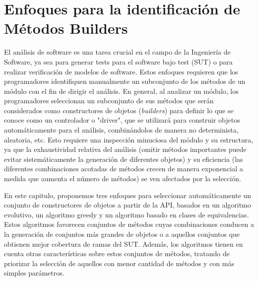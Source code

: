 \chapter[Identificación de métodos builders]{Enfoques para la identificación de Métodos Builders}
\label{cap:builders}

El análisis de software es una tarea crucial en el campo de la Ingeniería de Software, ya sea para generar tests para el software bajo test (SUT)  o para realizar verificación de modelos de software. Estos enfoques requieren que los programadores identifiquen manualmente un subconjunto de los métodos de un módulo con el fin de dirigir el análisis. En general, al analizar un módulo, los programadores seleccionan un subconjunto de sus métodos que serán considerados como constructores de objetos (\emph{builders}) para definir lo que se conoce como un controlador o "driver", que se utilizará para construir objetos automáticamente para el análisis, combinándolos de manera no determinista, aleatoria, etc. Esto requiere una inspección minuciosa del módulo y su estructura, ya que la exhaustividad relativa del análisis (omitir métodos importantes puede evitar sistemáticamente la generación de diferentes objetos) y su eficiencia (las diferentes combinaciones acotadas de métodos crecen de manera exponencial a medida que aumenta el número de métodos) se ven afectados por la selección.

En este capitulo, proponemos tres enfoques para seleccionar automáticamente un conjunto de constructores de objetos a partir de la API, basados en un algoritmo evolutivo, un algoritmo greedy y un algoritmo basado en clases de equivalencias. Estos algoritmos favorecen conjuntos de métodos cuyas combinaciones conducen a la generación de conjuntos más grandes de objetos o a aquellos conjuntos que obtienen mejor cobertura de ramas del SUT. Además, los algoritmos tienen en cuenta otras características sobre estos conjuntos de métodos, tratando de priorizar la selección de aquellos con menor cantidad de métodos y con más simples parámetros.


